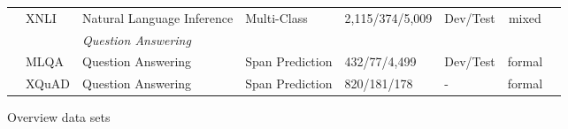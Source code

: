 \begin{landscape}
{\begin{tabularx}{\linewidth}{ll|lllllX}
                                                             & XNLI               & Natural Language Inference  & Multi-Class                 & 2,115/374/5,009                                       & Dev/Test                            & \multicolumn{1}{c}{mixed}                                    &                                                           \\ \cline{3-8}
                                                             &                    & \multicolumn{6}{g}{\textit{Question Answering}}\\
                                                             & MLQA               & Question Answering          & Span Prediction             & 432/77/4,499                                          & Dev/Test                            & \multicolumn{1}{c}{formal}                                   &                                                           \\
                                                             & XQuAD              & Question Answering          & Span Prediction             & 820/181/178                                           & -                                   & \multicolumn{1}{c}{formal}                                   &
\end{tabularx}
}{Overview data sets}


\end{landscape}
%
%
%
